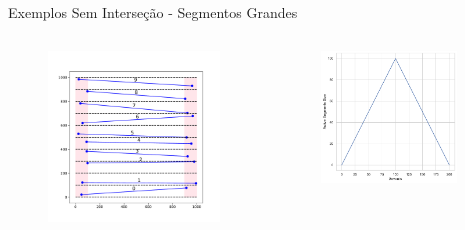 \documentclass[aspectratio=169,usenames,dvipsnames]{beamer}
\begin{document}
\begin{frame}{Exemplos Sem Interseção - Segmentos Grandes}
  \begin{columns}
    \begin{column}{0.35\textwidth}
      \begin{figure}
        \includegraphics[width=\textwidth]{figs/big_example.pdf}
      \end{figure}
    \end{column}
    \begin{column}{0.65\textwidth}
      \begin{figure}
        \includegraphics[width=0.9\textwidth]{figs/ativos/big_detection_segments_size_100.pdf}
      \end{figure}
    \end{column}
  \end{columns}
\end{frame}
\end{document}
